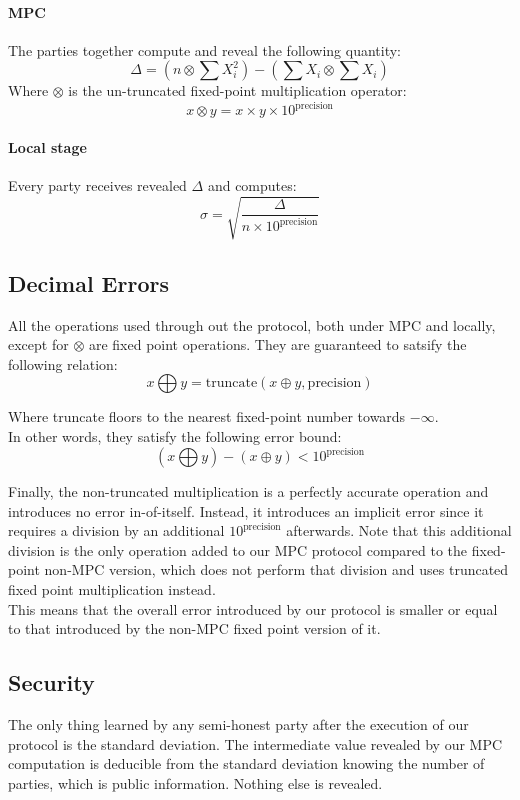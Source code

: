 \documentclass[11pt, oneside]{article}   	%
\begin{document}
\paragraph{MPC} The parties together compute and reveal the following quantity:
$$\Delta = (n \otimes \sum{X_i^2}) - (\sum{X_i} \otimes \sum{X_i})$$
Where $\otimes$ is the un-truncated fixed-point multiplication operator:
$$ x \otimes y = x \times y \times 10^{\text{precision}}$$

\paragraph{Local stage} Every party receives revealed $\Delta$ and computes:
$$\sigma = \sqrt{\frac{\Delta}{n \times 10^\text{precision}}}$$

\subsection{Decimal Errors}
All the operations used through out the protocol, both under MPC and locally, except for $\otimes$ are fixed point operations. They are guaranteed to satsify the following relation:
$$x \bigoplus y = \text{truncate}(x \oplus y, \text{precision})$$

Where truncate floors to the nearest fixed-point number towards $-\infty$. \\

\noindent In other words, they satisfy the following error bound:
$$(x \bigoplus y) - (x \oplus y) < 10^\text{precision}$$

\noindent Finally, the non-truncated multiplication is a perfectly accurate operation and introduces no error in-of-itself. Instead, it introduces an implicit error since it requires a division by an additional $10^\text{precision}$ afterwards. Note that this additional division is the only operation added to our MPC protocol compared to the fixed-point non-MPC version, which does not perform that division and uses truncated fixed point multiplication instead. \\

\noindent This means that the overall error introduced by our protocol is smaller or equal to that introduced by the non-MPC fixed point version of it.

\subsection{Security} The only thing learned by any semi-honest party after the execution of our protocol is the standard deviation. The intermediate value revealed by our MPC computation is deducible from the standard deviation knowing the number of parties, which is public information. Nothing else is revealed.
\end{document}
